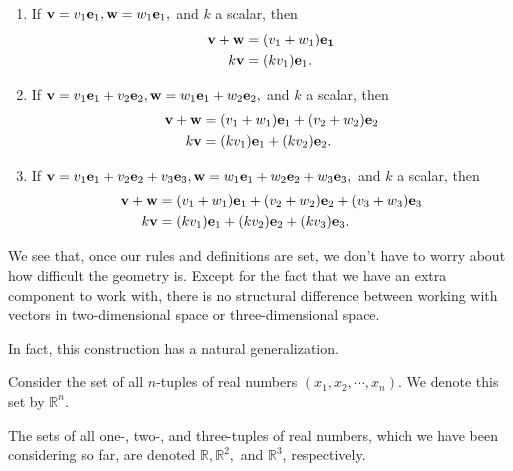 \documentclass[12pt,letterpaper,reqno]{article}
\numberwithin{equation}{section}
\begin{document}
\begin{enumerate}[(1)]
	\item If ${\bf v}=v_1{\bf e}_1,{\bf w}=w_1{\bf e}_1,$ and $k$ a scalar, then
	\begin{align*}
		{\bf v}+{\bf w}&=(v_1+w_1){\bf e_1} \\
		k{\bf v}&=(kv_1){\bf e}_1.
	\end{align*}
	\item If ${\bf v}=v_1{\bf e}_1+v_2{\bf e}_2,{\bf w}=w_1{\bf e}_1+w_2{\bf e}_2,$ and $k$ a scalar, then
	\begin{align*}
		{\bf v}+{\bf w}&=(v_1+w_1){\bf e}_1+(v_2+w_2){\bf e}_2 \\
		k{\bf v}&=(kv_1){\bf e}_1+(kv_2){\bf e}_2.
	\end{align*}
	\item If ${\bf v}=v_1{\bf e}_1+v_2{\bf e}_2+v_3{\bf e}_3,{\bf w}=w_1{\bf e}_1+w_2{\bf e}_2+w_3{\bf e}_3,$ and $k$ a scalar, then
	\begin{align*}
		{\bf v}+{\bf w}&=(v_1+w_1){\bf e}_1+(v_2+w_2){\bf e}_2+(v_3+w_3){\bf e}_3 \\
		k{\bf v}&=(kv_1){\bf e}_1+(kv_2){\bf e}_2+(kv_3){\bf e}_3.
	\end{align*}
\end{enumerate}

We see that, once our rules and definitions are set, we don't have to worry about how difficult the geometry is. Except for the fact that we have an extra component to work with, there is no structural difference between working with vectors in two-dimensional space or three-dimensional space.

In fact, this construction has a natural generalization.

\begin{defn}
	Consider the set of all $n$-tuples of real numbers $(x_1,x_2,\cdots,x_n)$. We denote this set by $\mathbb{R}^n$.
\end{defn}

\begin{example}
	The sets of all one-, two-, and three-tuples of real numbers, which we have been considering so far, are denoted $\mathbb{R}, \mathbb{R}^2,$ and $\mathbb{R}^3$, respectively.
\end{example}
\end{document}
